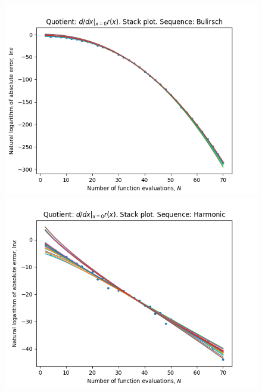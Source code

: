 \begin{figure}[H]
\centering
\begin{minipage}{0.45\textwidth}
\centering
\includegraphics[scale=0.45]{../results/diff_quot_plots/rho_hp_bulirsch_stack.png}
\end{minipage}
\begin{minipage}{0.45\textwidth}
\centering
\includegraphics[scale=0.45]{../results/diff_quot_plots/rho_hp_harmonic_stack.png}
\end{minipage}
\end{figure}

